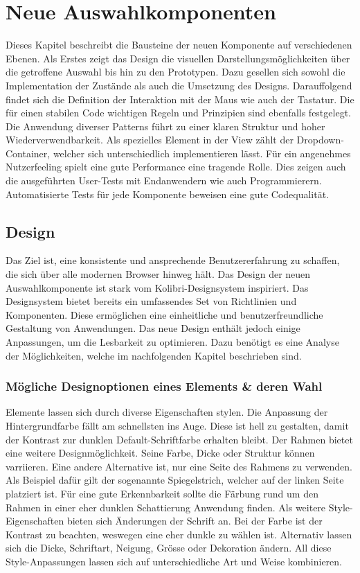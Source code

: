 \chapter{Neue Auswahlkomponenten}
\label{chap:newComponent}

Dieses Kapitel beschreibt die Bausteine der neuen Komponente auf verschiedenen Ebenen. 
Als Erstes zeigt das Design die visuellen Darstellungsmöglichkeiten über die getroffene Auswahl bis hin zu den Prototypen. 
Dazu gesellen sich sowohl die Implementation der Zustände als auch die Umsetzung des Designs.
Darauffolgend findet sich die Definition der Interaktion mit der Maus wie auch der Tastatur. 
Die für einen stabilen Code wichtigen Regeln und Prinzipien sind ebenfalls festgelegt. 
Die Anwendung diverser Patterns führt zu einer klaren Struktur und hoher Wiederverwendbarkeit. 
Als spezielles Element in der View zählt der Dropdown-Container, welcher sich unterschiedlich implementieren lässt. 
Für ein angenehmes Nutzerfeeling spielt eine gute Performance eine tragende Rolle. 
Dies zeigen auch die ausgeführten User-Tests mit Endanwendern wie auch Programmierern. 
Automatisierte Tests für jede Komponente beweisen eine gute Codequalität. 


\section{Design}
\label{sec:design}

Das Ziel ist, eine konsistente und ansprechende Benutzererfahrung zu schaffen, die sich über alle modernen Browser hinweg hält. 
Das Design der neuen Auswahlkomponente ist stark vom Kolibri-Designsystem inspiriert. 
Das Designsystem bietet bereits ein umfassendes Set von Richtlinien und Komponenten. 
Diese ermöglichen eine einheitliche und benutzerfreundliche Gestaltung von Anwendungen. 
Das neue Design enthält jedoch einige Anpassungen, um die Lesbarkeit zu optimieren. 
Dazu benötigt es eine Analyse der Möglichkeiten, welche im nachfolgenden Kapitel beschrieben sind. 


\subsection{Mögliche Designoptionen eines Elements \& deren Wahl}
\label{sec:possibleDesignOptions}

Elemente lassen sich durch diverse Eigenschaften stylen. 
Die Anpassung der Hintergrundfarbe fällt am schnellsten ins Auge. 
Diese ist hell zu gestalten, damit der Kontrast zur dunklen Default-Schriftfarbe erhalten bleibt. 
Der Rahmen bietet eine weitere Designmöglichkeit. 
Seine Farbe, Dicke oder Struktur können varriieren. 
Eine andere Alternative ist, nur eine Seite des Rahmens zu verwenden. 
Als Beispiel dafür gilt der sogenannte Spiegelstrich, welcher auf der linken Seite platziert ist. 
Für eine gute Erkennbarkeit sollte die Färbung rund um den Rahmen in einer eher dunklen Schattierung Anwendung finden. 
Als weitere Style-Eigenschaften bieten sich Änderungen der Schrift an. 
Bei der Farbe ist der Kontrast zu beachten, weswegen eine eher dunkle zu wählen ist. 
Alternativ lassen sich die Dicke, Schriftart, Neigung, Grösse oder Dekoration ändern. 
All diese Style-Anpassungen lassen sich auf unterschiedliche Art und Weise kombinieren. 


